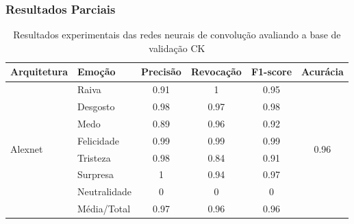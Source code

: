 \documentclass{beamer}
\begin{document}
\begin{frame}
 \frametitle{Resultados Parciais}
\begin{table}[]
\tiny
\centering
\caption{Resultados experimentais das redes neurais de convolução avaliando a base de validação CK}
\label{table:ck}
\begin{tabular}{llcccc}
\hline
\textbf{Arquitetura}                   & \textbf{Emoção}       & \multicolumn{1}{l}{\textbf{Precisão}} & \multicolumn{1}{l}{\textbf{Revocação}} & \multicolumn{1}{l}{\textbf{F1-score}} & \multicolumn{1}{l}{\textbf{Acurácia}} \\ \hline
\multirow{8}{*}{Alexnet}         & Raiva                 & 0.91                                  & 1                                      & 0.95                                  & \multirow{8}{*}{0.96}                 \\
                                       & Desgosto              & 0.98                                  & 0.97                                   & 0.98                                  &                                       \\
                                       & Medo                  & 0.89                                  & 0.96                                   & 0.92                                  &                                       \\
                                       & Felicidade            & 0.99                                  & 0.99                                   & 0.99                                  &                                       \\
                                       & Tristeza              & 0.98                                  & 0.84                                   & 0.91                                  &                                       \\
                                       & Surpresa              & 1                                     & 0.94                                   & 0.97                                  &                                       \\
                                       & Neutralidade          & 0                                     & 0                                      & 0                                     &                                       \\
                                       & Média/Total           & 0.97                                  & 0.96                                   & 0.96                                  &                                       \\ \hline

\end{tabular}
\end{table}
\end{frame}
\end{document}
